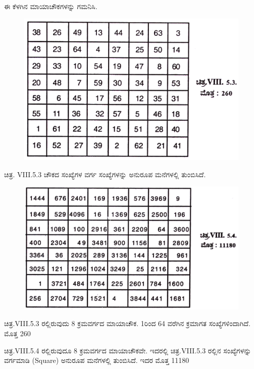 ಈ ಕೆಳಗಿನ ಮಾಯಾಚೌಕಗಳನ್ನು ಗಮನಿಸಿ.
\begin{figure}[H]
\includegraphics{src/figures/chap7/fig7-17.jpg}
\end{figure}

ಚಿತ್ರ. VIII.5.3 ಚೌಕದ ಸಂಖ್ಯೆಗಳ ವರ್ಗ ಸಂಖ್ಯೆಗಳನ್ನು ಅನುರೂಪ ಮನೆಗಳಲ್ಲಿ ತುಂಬಿಸಿದೆ.
\begin{figure}[H]
\includegraphics{src/figures/chap7/fig7-18.jpg}
\end{figure}

ಚಿತ್ರ.VIII.5.3 ರಲ್ಲಿರುವುದು 8 ಕ್ರಮವರ್ಗದ ಮಾಯಾಚೌಕ. 1ರಿಂದ 64 ವರೆಗಿನ ಕ್ರಮಾಗತ ಸಂಖ್ಯೆಗಳಿಂದಾಗಿದೆ. ಮೊತ್ತ 260

ಚಿತ್ರ.VIII.5.4 ರಲ್ಲಿರುವುದೂ 8 ಕ್ರಮವರ್ಗದ ಮಾಯಾಚೌಕವೇ. ಇದರಲ್ಲಿ ಚಿತ್ರ.VIII.5.3 ರಲ್ಲಿನ ಸಂಖ್ಯೆಗಳನ್ನು ವರ್ಗಮಾಡಿ (Square) ಅನುರೂಪ ಮನೆಗಳಲ್ಲಿ ತುಂಬಿಸಿದೆ. ಇದರ ಮೊತ್ತ 11180


